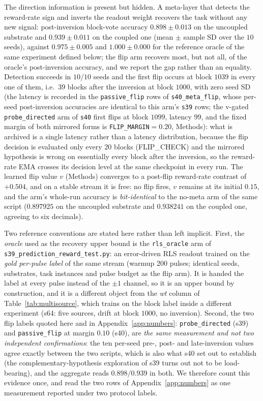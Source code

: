 \documentclass[preprint,12pt]{elsarticle}
\begin{document}
The direction information is present but hidden. A meta-layer that detects
the reward-rate sign and inverts the readout weight recovers the task without
any new signal: post-inversion block-vote accuracy $0.898\pm0.013$ on the
uncoupled substrate and $0.939\pm0.011$ on the coupled one (mean $\pm$ sample
SD over the $10$ seeds), against $0.975\pm0.005$ and $1.000\pm0.000$ for the
reference oracle of the same experiment defined below; the flip arm
recovers most, but not all, of the oracle's post-inversion accuracy, and we
report the gap rather than an equality. Detection succeeds in $10/10$ seeds and
the first flip occurs at block $1039$ in every one of them, i.e.\ $39$ blocks
after the inversion at block $1000$, with zero seed SD (the latency is
recorded in the \texttt{passive\_flip} rows of \texttt{s40\_meta\_flip},
whose per-seed post-inversion accuracies are identical to this arm's
\texttt{s39} rows; the v-gated \texttt{probe\_directed} arm of \texttt{s40}
first flips at block $1099$, latency $99$, and the fixed margin of both
mirrored forms is \texttt{FLIP\_MARGIN}$=0.20$, Methods): what is archived is a
single latency rather than a latency distribution, because the flip decision
is evaluated only every $20$ blocks (FLIP\_CHECK) and the mirrored hypothesis
is wrong on essentially every block after the inversion, so the reward-rate
EMA crosses its decision level at the same checkpoint in every run. The
learned flip value $v$ (Methods) converges to a post-flip reward-rate contrast
of $+0.504$, and on a stable stream it is free: no flip fires, $v$ remains at
its initial $0.15$, and the arm's whole-run accuracy is \emph{bit-identical}
to the no-meta arm of the same script ($0.897925$ on the uncoupled substrate
and $0.938241$ on the coupled one, agreeing to six decimals).

Two reference conventions are stated here rather than left implicit. First,
the \emph{oracle} used as the recovery upper bound is the \texttt{rls\_oracle}
arm of \texttt{s39\_prediction\_reward\_test.py}: an error-driven RLS readout
trained on the \emph{gold per-pulse label} of the same stream (warmup $200$
pulses; identical seeds, substrates, task instances and pulse budget as the
flip arm). It is handed the label at every pulse instead of the $\pm1$
channel, so it is an upper bound by construction, and it is a different object
from the \textit{wt} column of Table~\ref{tab:multisource}, which trains on
the block label inside a different experiment (s64: five sources, drift at
block $1000$, no inversion). Second, the two flip labels quoted here and in
Appendix~\ref{app:numbers}: \texttt{probe\_directed} (s39) and
\texttt{passive\_flip} at margin $0.10$ (s40), are \emph{the same
measurement and not two independent confirmations}: the ten per-seed pre-,
post- and late-inversion values agree exactly between the two scripts, which
is also what s40 set out to establish (the complementary-hypothesis
exploration of s39 turns out not to be load-bearing), and the aggregate reads
$0.898/0.939$ in both. We therefore count this evidence once, and read the two
rows of Appendix~\ref{app:numbers} as one measurement reported under two
protocol labels.
\end{document}
